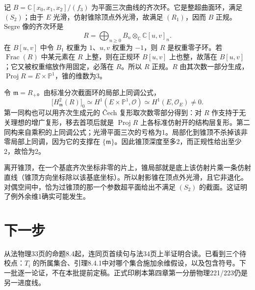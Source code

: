 \documentclass[openany,fontset=fandol]{ctexbook}
\DeclareMathOperator{\Proj}{Proj}
\begin{document}
记 $B=\mathbb C[x_0,x_1,x_2]/(f_3)$ 为平面三次曲线的齐次环。它是整超曲面环，满足 $(S_2)$；由于 $E$ 光滑，仿射锥除顶点外光滑，故满足 $(R_1)$，因而 $B$ 正规。Segre 像的齐次环是
\[
 R=\bigoplus_{n\ge0}B_n\otimes_{\mathbb C}\mathbb C[u,v]_n .
\]
在 $B[u,v]$ 中令 $B_1$ 权重为 $1$、$u,v$ 权重为 $-1$，则 $R$ 是权重零子环。若 $\operatorname{Frac}(R)$ 中某元素在 $R$ 上整，则在正规环 $B[u,v]$ 上也整，故落在 $B[u,v]$；它又被权重缩放作用固定，必落在 $R$。所以 $R$ 正规。$R$ 由其次数一部分生成，$\Proj R=E\times\mathbb P^1$，锥的维数为3。

令 $\mathfrak m=R_+$。由标准分次截面环的局部上同调公式，
\[
 \bigl[H^2_{\mathfrak m}(R)\bigr]_0
   \simeq H^1(E\times\mathbb P^1,\mathcal O)
   \simeq H^1(E,\mathcal O_E)\ne0 .
\]
第一同构也可以用齐次生成元的 Čech 复形取次数零部分得到：对 $R$ 作支持于无关理想的增广复形，移去首项后就是 $\Proj R$ 上各标准仿射开的结构层复形。第二同构来自乘积的上同调公式；光滑平面三次的亏格为1。局部化到锥顶不杀掉该非零局部上同调，因为它的支撑在 $\{\mathfrak m\}$。因此锥顶深度至多2，而正规性给出至少2，故恰为2。

离开锥顶，在一个基底齐次坐标非零的片上，锥局部就是底上该仿射片乘一条仿射直线（锥顶方向坐标除以该基底坐标）。所以射影锥在顶点外光滑，且它非退化。对偶空间中，恰为过锥顶的那一个参数超平面给出不满足 $(S_2)$ 的截面。这证明了例外余维1确实可能发生。

\section*{下一步}
从法物理33页的命题8.4起，连同页首续句与法34页上半证明合读。已看到三个待校点：$T_i$ 的所属集合、引理8.4.1中对哪个集合施加余维假设，以及包含符号。下一批逐一论证，不在本批提前定稿。正式印刷本第四章第一分册物理221/223仍是另一进度线。
\end{document}
